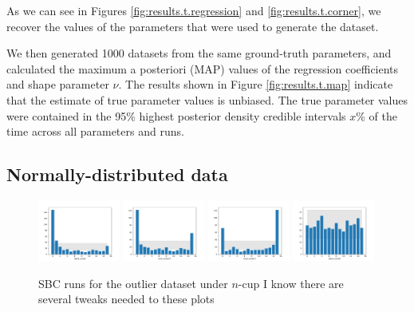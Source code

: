 \documentclass[fleqn,usenatbib]{mnras}
\begin{document}
As we can see in Figures \ref{fig:results.t.regression} and
\ref{fig:results.t.corner}, we recover the values of the parameters that were
used to generate the dataset.

We then generated 1000 datasets from the same ground-truth parameters, and
calculated the maximum a posteriori (MAP) values of the regression coefficients
and shape parameter $\nu$. The results shown in Figure
\ref{fig:results.t.map} indicate that the estimate of true parameter values is
unbiased.{
\color{red} The true parameter values were contained in the 95\% highest
posterior density credible intervals $x$\% of the time across all parameters and
runs.
}


\subsection{Normally-distributed data}
\label{sec:results.outlier}

\begin{figure}
    \includegraphics[width=0.24\textwidth]{graphics/sbc_outlier_ncup/alpha_scaled.pdf}
    \includegraphics[width=0.24\textwidth]{graphics/sbc_outlier_ncup/beta_scaled.0.pdf}
    \includegraphics[width=0.24\textwidth]{graphics/sbc_outlier_ncup/beta_scaled.1.pdf}
    \includegraphics[width=0.24\textwidth]{graphics/sbc_outlier_ncup/sigma_scaled.pdf}
    \caption{SBC runs for the outlier dataset under $n$-cup {\color{red} I know
    there are several tweaks needed to these plots}}
    \label{fig:results.t.sbc}
\end{figure}
\end{document}
